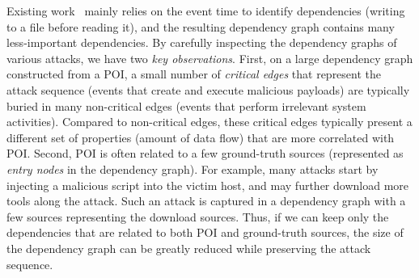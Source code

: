 %




Existing work~\cite{backtracking,backtracking2,taser,intrusionrecovery,liu2018priotracker} mainly relies on the event time to identify dependencies (\eg writing to a file before reading it), and the resulting dependency graph contains many less-important dependencies.
By carefully inspecting the dependency graphs of various attacks, we have two \emph{key observations}.
First, on a large dependency graph constructed from a POI,
a small number of \emph{critical edges} that represent the attack sequence (\eg events that create and execute malicious payloads) are typically buried in many non-critical edges (\eg events that perform irrelevant system activities).
Compared to non-critical edges, these critical edges typically present a different set of properties (\eg amount of data flow) that are more correlated with POI.
Second, POI is often related to a few ground-truth sources (represented as \emph{entry nodes} in the dependency graph). 
For example, many attacks start by injecting a malicious script into the victim host,
and may further download more tools along the attack.
Such an attack is captured in a dependency graph with a few sources representing the download sources. 
Thus, if we can keep only the dependencies that are related to both POI and ground-truth sources, the size of the dependency graph can be greatly reduced while preserving the attack sequence.


